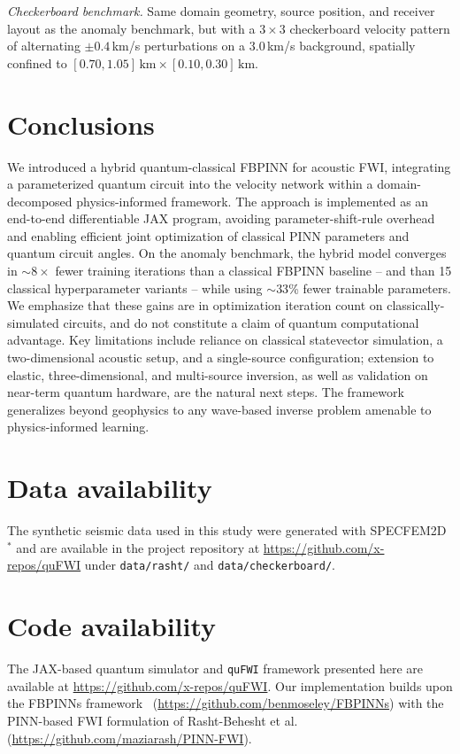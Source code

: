 \documentclass[11pt,a4paper]{article}
\newcommand{\newcite}[1]{\textcolor{todoRed}{$^{\ast}$}\citep{#1}}
\begin{document}
\textit{Checkerboard benchmark.}
Same domain geometry, source position, and receiver layout as the anomaly benchmark, but with a $3\!\times\!3$ checkerboard velocity pattern of alternating $\pm$$0.4$\,km/s perturbations on a $3.0$\,km/s background, spatially confined to $[0.70, 1.05]\,\text{km} \times [0.10, 0.30]\,\text{km}$.


\section{Conclusions}

We introduced a hybrid quantum-classical FBPINN for acoustic FWI, integrating a parameterized quantum circuit into the velocity network within a domain-decomposed physics-informed framework. The approach is implemented as an end-to-end differentiable JAX program, avoiding parameter-shift-rule overhead and enabling efficient joint optimization of classical PINN parameters and quantum circuit angles. On the anomaly benchmark, the hybrid model converges in $\sim$$8\times$ fewer training iterations than a classical FBPINN baseline -- and than 15 classical hyperparameter variants -- while using $\sim$$33$\% fewer trainable parameters. We emphasize that these gains are in optimization iteration count on classically-simulated circuits, and do not constitute a claim of quantum computational advantage. Key limitations include reliance on classical statevector simulation, a two-dimensional acoustic setup, and a single-source configuration; extension to elastic, three-dimensional, and multi-source inversion, as well as validation on near-term quantum hardware, are the natural next steps. The framework generalizes beyond geophysics to any wave-based inverse problem amenable to physics-informed learning.


\section*{Data availability}
The synthetic seismic data used in this study were generated with SPECFEM2D~\newcite{komatitsch1998spectral} and are available in the project repository at \url{https://github.com/x-repos/quFWI} under \texttt{data/rasht/} and \texttt{data/checkerboard/}.

\section*{Code availability}
The JAX-based quantum simulator and \texttt{quFWI} framework presented here are available at \url{https://github.com/x-repos/quFWI}. Our implementation builds upon the FBPINNs framework~\cite{Moseley2023} (\url{https://github.com/benmoseley/FBPINNs}) with the PINN-based FWI formulation of Rasht-Behesht et al.~\cite{rahst} (\url{https://github.com/maziarash/PINN-FWI}).
\end{document}

